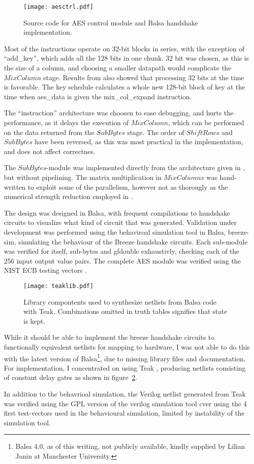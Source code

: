 \begin{figure}[htbp]
  \centering
  \texttt{[image: aesctrl.pdf]}
  \caption{Source code for AES control module and Balsa handshake
    implementation.}
  \label{fig:aesctrl}
\end{figure}

Most of the instructions operate on 32-bit blocks in series, with the
exception of ``add\_key'', which adds all the 128 bits in one
chunk. 32 bit was chosen, as this is the size of a column, and
choosing a smaller datapath would complicate the $MixColumn$
stage. Results from \cite{ekelund} also showed that processing 32 bits
at the time is favorable.  The key schedule calculates a whole new
128-bit block of key at the time when aes\_data is given the
mix\_col\_expand instruction.

The ``instruction'' architecture was choosen to ease debugging, and
hurts the performance, as it delays the execution of $MixColumn$,
which can be performed on the data returned from the $SubBytes$
stage. The order of $ShiftRows$ and $SubBytes$ have been reversed, as
this was most practical in the implementation, and does not affect
correctnes.


The $SubBytes$-module was implemented directly from the architecture
given in \cite{csbox}, but without pipelining. The matrix
multiplication in $MixColumns$ was hand-written to exploit some of the
parallelism, however not as thorougly as the numerical strength
reduction employed in \cite[pp. 20-23]{ekelund}.

The design was designed in Balsa, with frequent compilations to
handshake circuits to visualize what kind of circuit that was
generated. Validation under development was performed using the
behaviroal simulation tool in Balsa, breeze-sim, simulating the
behaviour of the Breeze handshake circuits. Each sub-module was
verified for itself, sub-bytes and gfdouble exhaustivly, checking each
of the 256 input output value pairs. The complete AES module was
verified using the NIST ECB testing vectors \cite{nisttest}.

\begin{figure}[htbp]
  \centering
  \texttt{[image: teaklib.pdf]}
  \caption{Library compontents used to synthesize netlists from Balsa
    code with Teak. Combinations omitted in truth tables signifies
    that state is kept.}
  \label{fig:teaklib}
\end{figure}

While it should be able to implement the breeze handshake circuits to
functionally equivalent netlists for mapping to hardware, I was not
able to do this with the latest version of Balsa\footnote{Balsa 4.0,
  as of this writing, not publicly available, kindly supplied by
  Lilian Janin at Manchester University.}, due to missing library
files and documentation. For implementation, I concentrated on using
Teak \cite{teak}, producing netlists consisting of constant delay
gates as shown in figure~\ref{fig:teaklib}.

In addition to the behavrioal simulation, the Verilog netlist
generated from Teak was verified using the GPL version of the verilog
simulation tool cver using the 4 first test-vectors used in the
behavioural simulation, limited by instability of the simulation tool.
